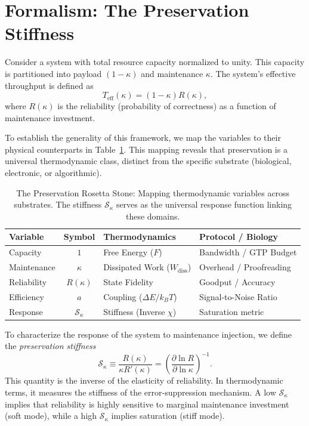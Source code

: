 \documentclass[11pt,twocolumn]{article}
\begin{document}
\section{Formalism: The Preservation Stiffness}

Consider a system with total resource capacity normalized to unity. This capacity is partitioned into payload $(1-\kappa)$ and maintenance $\kappa$. The system's effective throughput is defined as
\begin{equation}
T_{\mathrm{eff}}(\kappa) = (1-\kappa)R(\kappa),
\label{eq:throughput}
\end{equation}
where $R(\kappa)$ is the reliability (probability of correctness) as a function of maintenance investment.

To establish the generality of this framework, we map the variables to their physical counterparts in Table~\ref{tab:rosetta}. This mapping reveals that preservation is a universal thermodynamic class, distinct from the specific substrate (biological, electronic, or algorithmic).

\begin{table}[t]
\centering
\caption{The Preservation Rosetta Stone: Mapping thermodynamic variables across substrates. The stiffness $\mathcal{S}_\kappa$ serves as the universal response function linking these domains.}
\label{tab:rosetta}
\renewcommand{\arraystretch}{1.4}
\begin{tabular}{l c l l}
\toprule
\textbf{Variable} & \textbf{Symbol} & \textbf{Thermodynamics} & \textbf{Protocol / Biology} \\
\midrule
Capacity & $1$ & Free Energy ($F$) & Bandwidth / GTP Budget \\
Maintenance & $\kappa$ & Dissipated Work ($W_{\text{diss}}$) & Overhead / Proofreading \\
Reliability & $R(\kappa)$ & State Fidelity & Goodput / Accuracy \\
Efficiency & $a$ & Coupling ($\Delta E / k_B T$) & Signal-to-Noise Ratio \\
Response & $\mathcal{S}_\kappa$ & Stiffness (Inverse $\chi$) & Saturation metric \\
\bottomrule
\end{tabular}
\end{table}

To characterize the response of the system to maintenance injection, we define the \emph{preservation stiffness}
\begin{equation}
\mathcal{S}_\kappa \equiv \frac{R(\kappa)}{\kappa R'(\kappa)} = \left(\frac{\partial \ln R}{\partial \ln \kappa}\right)^{-1}.
\label{eq:stiffness}
\end{equation}
This quantity is the inverse of the elasticity of reliability. In thermodynamic terms, it measures the stiffness of the error-suppression mechanism. A low $\mathcal{S}_\kappa$ implies that reliability is highly sensitive to marginal maintenance investment (soft mode), while a high $\mathcal{S}_\kappa$ implies saturation (stiff mode).
\end{document}
